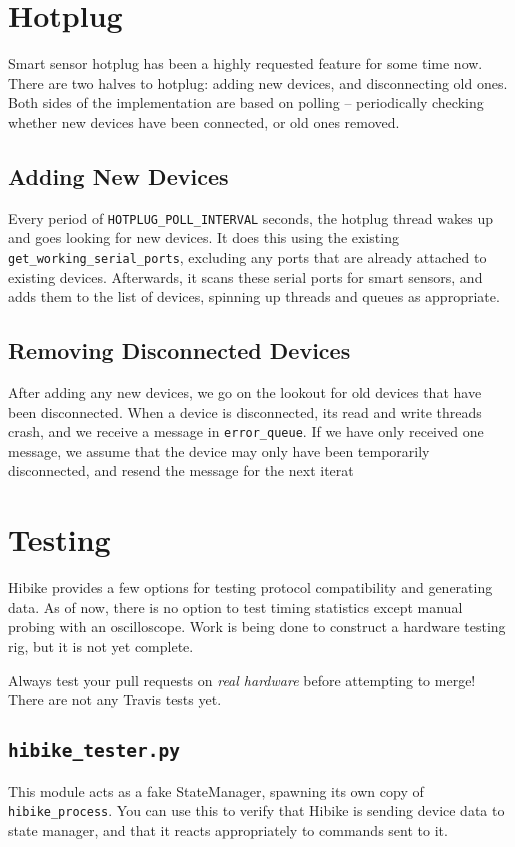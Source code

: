 \documentclass[12pt]{book}
\begin{document}
\section{Hotplug}
Smart sensor hotplug has been a highly requested feature for some time now.
There are two halves to hotplug: adding new devices, and disconnecting old ones.
Both sides of the implementation are based on polling -- periodically checking
whether new devices have been connected, or old ones removed.

\subsection{Adding New Devices}
Every period of \texttt{HOTPLUG\_POLL\_INTERVAL} seconds, the hotplug thread
wakes up and goes looking for new devices. It does this using the existing
\texttt{get\_working\_serial\_ports}, excluding any ports that are already
attached to existing devices. Afterwards, it scans these serial ports for smart
sensors, and adds them to the list of devices, spinning up threads and queues
as appropriate.

\subsection{Removing Disconnected Devices}
After adding any new devices, we go on the lookout for old devices that
have been disconnected. When a device is disconnected, its read and
write threads crash, and we receive a message in \texttt{error\_queue}.
If we have only received one message, we assume that the device may only
have been temporarily disconnected, and resend the message for the next iterat

\section{Testing}
Hibike provides a few options for testing protocol compatibility
and generating data.
As of now, there is no option to test timing statistics except
manual probing with an oscilloscope. Work is being done to
construct a hardware testing rig, but it is not yet complete.

Always test your pull requests on \textit{real hardware} before
attempting to merge! There are not any Travis tests yet.
\subsection{\texttt{hibike\_tester.py}}
This module acts as a fake StateManager, spawning its own
copy of \texttt{hibike\_process}. You can use this to verify
that Hibike is sending device data to state manager, and that
it reacts appropriately to commands sent to it.
\end{document}
